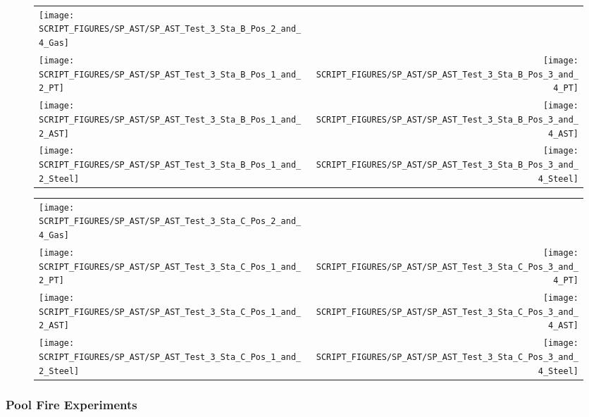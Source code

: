 \begin{figure}[p]
\begin{tabular*}{\textwidth}{l@{\extracolsep{\fill}}r}
\texttt{[image: SCRIPT\_FIGURES/SP\_AST/SP\_AST\_Test\_3\_Sta\_B\_Pos\_2\_and\_4\_Gas]} &
  \\
\texttt{[image: SCRIPT\_FIGURES/SP\_AST/SP\_AST\_Test\_3\_Sta\_B\_Pos\_1\_and\_2\_PT]} &
\texttt{[image: SCRIPT\_FIGURES/SP\_AST/SP\_AST\_Test\_3\_Sta\_B\_Pos\_3\_and\_4\_PT]} \\
\texttt{[image: SCRIPT\_FIGURES/SP\_AST/SP\_AST\_Test\_3\_Sta\_B\_Pos\_1\_and\_2\_AST]} &
\texttt{[image: SCRIPT\_FIGURES/SP\_AST/SP\_AST\_Test\_3\_Sta\_B\_Pos\_3\_and\_4\_AST]} \\
\texttt{[image: SCRIPT\_FIGURES/SP\_AST/SP\_AST\_Test\_3\_Sta\_B\_Pos\_1\_and\_2\_Steel]} &
\texttt{[image: SCRIPT\_FIGURES/SP\_AST/SP\_AST\_Test\_3\_Sta\_B\_Pos\_3\_and\_4\_Steel]}
\end{tabular*}
\label{SP_Test_3_Station_B}
\end{figure}

\begin{figure}[p]
\begin{tabular*}{\textwidth}{l@{\extracolsep{\fill}}r}
\texttt{[image: SCRIPT\_FIGURES/SP\_AST/SP\_AST\_Test\_3\_Sta\_C\_Pos\_2\_and\_4\_Gas]} &
  \\
\texttt{[image: SCRIPT\_FIGURES/SP\_AST/SP\_AST\_Test\_3\_Sta\_C\_Pos\_1\_and\_2\_PT]} &
\texttt{[image: SCRIPT\_FIGURES/SP\_AST/SP\_AST\_Test\_3\_Sta\_C\_Pos\_3\_and\_4\_PT]} \\
\texttt{[image: SCRIPT\_FIGURES/SP\_AST/SP\_AST\_Test\_3\_Sta\_C\_Pos\_1\_and\_2\_AST]} &
\texttt{[image: SCRIPT\_FIGURES/SP\_AST/SP\_AST\_Test\_3\_Sta\_C\_Pos\_3\_and\_4\_AST]} \\
\texttt{[image: SCRIPT\_FIGURES/SP\_AST/SP\_AST\_Test\_3\_Sta\_C\_Pos\_1\_and\_2\_Steel]} &
\texttt{[image: SCRIPT\_FIGURES/SP\_AST/SP\_AST\_Test\_3\_Sta\_C\_Pos\_3\_and\_4\_Steel]}
\end{tabular*}
\label{SP_Test_3_Station_C}
\end{figure}

\clearpage

\subsubsection{Pool Fire Experiments}

